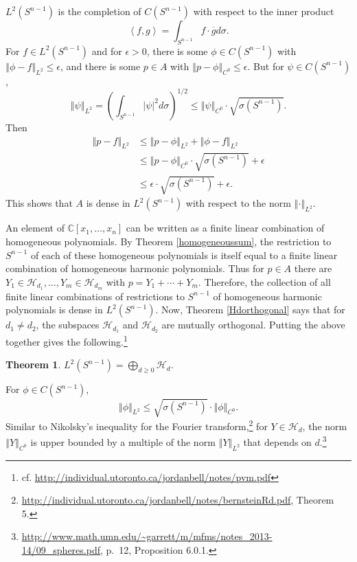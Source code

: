 \documentclass{article}
\newcommand{\inner}[2]{\left\langle #1, #2 \right\rangle}
\newcommand{\norm}[1]{\left\Vert #1 \right\Vert}
\newtheorem{theorem}{Theorem}
\theoremstyle{definition}
\begin{document}
$L^2(S^{n-1})$ is the completion of $C(S^{n-1})$ with respect to the inner product
\[
\inner{f}{g} = \int_{S^{n-1}} f \cdot \overline{g} d\sigma.
\]
For $f \in L^2(S^{n-1})$ and for $\epsilon>0$, there is some $\phi \in C(S^{n-1})$ with
$\norm{\phi-f}_{L^2}\leq \epsilon$, and there is some $p \in A$ with
$\norm{p-\phi}_{C^0}\leq \epsilon$.
But for $\psi \in C(S^{n-1})$,
\[
\norm{\psi}_{L^2} = \left( \int_{S^{n-1}} |\psi|^2 d\sigma \right)^{1/2}
\leq \norm{\psi}_{C^0} \cdot \sqrt{\sigma(S^{n-1})}.
\]
Then
\begin{align*}
\norm{p-f}_{L^2} &\leq \norm{p-\phi}_{L^2} + \norm{\phi-f}_{L^2}\\
&\leq \norm{p-\phi}_{C^0} \cdot \sqrt{\sigma(S^{n-1})} + 
\epsilon\\
&\leq \epsilon \cdot \sqrt{\sigma(S^{n-1})}+\epsilon.
\end{align*}
This shows that $A$ is dense in $L^2(S^{n-1})$ with respect to the norm $\norm{\cdot}_{L^2}$. 

An element of $\mathbb{C}[x_1,\ldots,x_n]$ can be written as a finite linear combination of homogeneous polynomials.
By Theorem \ref{homogeneoussum}, the restriction to $S^{n-1}$ of each of these homogeneous polynomials
is itself equal to a finite linear combination of homogeneous harmonic polynomials. 
Thus for $p \in A$ there are $Y_1 \in \mathscr{H}_{d_1}, \ldots, Y_m \in \mathscr{H}_{d_m}$ with
$p = Y_1 + \cdots + Y_m$. Therefore, the collection of all finite linear combinations of restrictions to $S^{n-1}$
of homogeneous harmonic
polynomials is dense in $L^2(S^{n-1})$.
Now, Theorem \ref{Hdorthogonal} says that for $d_1 \neq d_2$, the subspaces
$\mathscr{H}_{d_1}$ and $\mathscr{H}_{d_2}$ are mutually orthogonal. 
Putting the above together gives the following.\footnote{cf. \url{http://individual.utoronto.ca/jordanbell/notes/pvm.pdf}}

\begin{theorem}
$L^2(S^{n-1}) = \bigoplus_{d \geq 0} \mathscr{H}_d$.
\end{theorem}


For $\phi \in C(S^{n-1})$,  
\[
\norm{\phi}_{L^2} \leq \sqrt{\sigma(S^{n-1})} \cdot \norm{\phi}_{C^0}.
\]
Similar to Nikolsky's inequality for the Fourier transform,\footnote{\url{http://individual.utoronto.ca/jordanbell/notes/bernsteinRd.pdf},
Theorem 5.}
for $Y \in \mathscr{H}_d$,
the norm $\norm{Y}_{C^0}$ is upper bounded by a  multiple of the norm $\norm{Y}_{L^2}$ that depends on $d$.\footnote{\url{http://www.math.umn.edu/~garrett/m/mfms/notes_2013-14/09_spheres.pdf},
p.~12, Proposition 6.0.1.}
\end{document}
